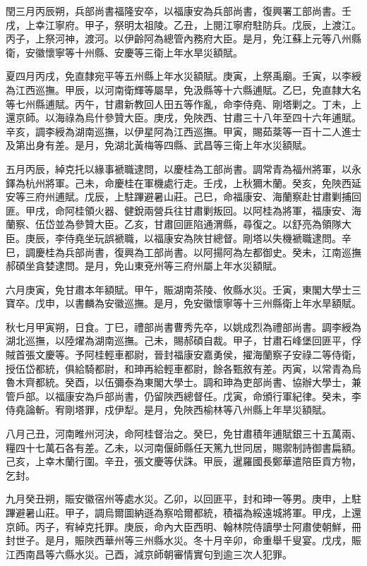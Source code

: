 \begin{pinyinscope}
閏三月丙辰朔，兵部尚書福隆安卒，以福康安為兵部尚書，復興署工部尚書。壬戌，上幸江寧府。甲子，祭明太祖陵。乙丑，上閱江寧府駐防兵。戊辰，上渡江。丙子，上祭河神，渡河。以伊齡阿為總管內務府大臣。是月，免江蘇上元等八州縣衛，安徽懷寧等十州縣、安慶等三衛上年水旱災額賦。

夏四月丙戌，免直隸宛平等五州縣上年水災額賦。庚寅，上祭禹廟。壬寅，以李綬為江西巡撫。甲辰，以河南衛輝等屬旱，免汲縣等十六縣逋賦。乙巳，免直隸大名等七州縣逋賦。丙午，甘肅新教回人田五等作亂，命李侍堯、剛塔剿之。丁未，上還京師。以海祿為烏什參贊大臣。庚戌，免陜西、甘肅三十八年至四十六年逋賦。辛亥，調李綬為湖南巡撫，以伊星阿為江西巡撫。甲寅，賜茹棻等一百十二人進士及第出身有差。是月，免湖北黃梅等四縣、武昌等三衛上年水災額賦。

五月丙辰，綽克托以緣事褫職逮問，以慶桂為工部尚書。調常青為福州將軍，以永鐸為杭州將軍。己未，命慶桂在軍機處行走。壬戌，上秋獮木蘭。癸亥，免陜西延安等三府州逋賦。戊辰，上駐蹕避暑山莊。己巳，命福康安、海蘭察赴甘肅剿捕回匪。甲戌，命阿桂領火器、健銳兩營兵往甘肅剿叛回。以阿桂為將軍，福康安、海蘭察、伍岱並為參贊大臣。乙亥，甘肅回匪陷通渭縣，尋復之。以舒亮為領隊大臣。庚辰，李侍堯坐玩誤褫職，以福康安為陜甘總督。剛塔以失機褫職逮問。辛巳，調慶桂為兵部尚書，復興為工部尚書。以阿揚阿為左都御史。癸未，江南巡撫郝碩坐貪婪逮問。是月，免山東兗州等三府州屬上年水災額賦。

六月庚寅，免甘肅本年額賦。甲午，賑湖南茶陵、攸縣水災。壬寅，東閣大學士三寶卒。戊申，以書麟為安徽巡撫。是月，免安徽懷寧等十三州縣衛上年水旱額賦。

秋七月甲寅朔，日食。丁巳，禮部尚書曹秀先卒，以姚成烈為禮部尚書。調李綬為湖北巡撫，以陸燿為湖南巡撫。己未，賜郝碩自裁。甲子，甘肅石峰堡回匪平，俘賊首張文慶等。予阿桂輕車都尉，晉封福康安嘉勇侯，擢海蘭察子安祿二等侍衛，授伍岱都統，俱給騎都尉，和珅再給輕車都尉，餘各甄敘有差。丙寅，以常青為烏魯木齊都統。癸酉，以伍彌泰為東閣大學士。調和珅為吏部尚書、協辦大學士，兼管戶部。以福康安為戶部尚書，仍留陜西總督任。戊寅，命頒行軍紀律。癸未，李侍堯論斬。宥剛塔罪，戍伊犁。是月，免陜西榆林等八州縣上年旱災額賦。

八月己丑，河南睢州河決，命阿桂督治之。癸巳，免甘肅積年逋賦銀三十五萬兩、糧四十七萬石各有差。乙未，以河南偃師縣任天篤九世同居，賜禦制詩御書扁額。己亥，上幸木蘭行圍。辛丑，張文慶等伏誅。甲辰，暹羅國長鄭華遣陪臣貢方物，乞封。

九月癸丑朔，賑安徽宿州等處水災。乙卯，以回匪平，封和珅一等男。庚申，上駐蹕避暑山莊。甲子，調烏爾圖納遜為察哈爾都統，積福為綏遠城將軍。甲戌，上還京師。丙子，宥綽克托罪。庚辰，命內大臣西明、翰林院侍讀學士阿肅使朝鮮，冊封世子。是月，賑陜西華州等三州縣水災。冬十月辛卯，命重舉千叟宴。戊戌，賑江西南昌等六縣水災。己酉，減京師朝審情實句到逾三次人犯罪。


\end{pinyinscope}
